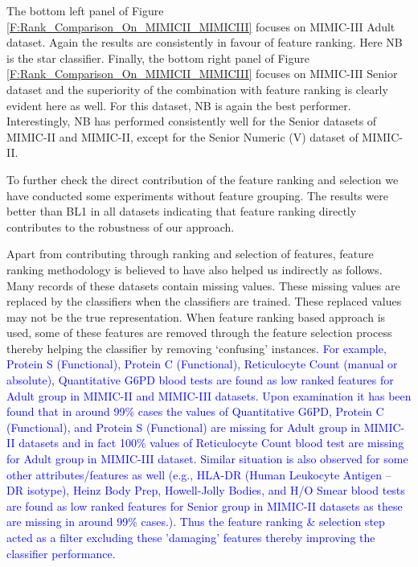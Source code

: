The bottom left panel of Figure \ref{F:Rank_Comparison_On_MIMICII_MIMICIII} focuses on MIMIC-III Adult dataset. Again the results are consistently in favour of feature ranking. Here NB is the star classifier. Finally, the bottom right panel of Figure \ref{F:Rank_Comparison_On_MIMICII_MIMICIII} focuses on MIMIC-III Senior dataset and the superiority of the combination with feature ranking is clearly evident here as well. For this dataset, NB is again the best performer. Interestingly, NB has performed consistently well for the Senior datasets of MIMIC-II and MIMIC-II, except for the Senior Numeric (V) dataset of MIMIC-II. 

To further check the direct contribution of the feature ranking and selection we have conducted some experiments without feature grouping. The results were better than BL1 in all datasets indicating that feature ranking directly contributes to the robustness of our approach.    

Apart from contributing through ranking and selection of features, feature ranking methodology is believed to have also helped us indirectly as follows. Many records of these datasets contain missing values. These missing values are replaced by the classifiers when the classifiers are trained. These replaced values may not be the true representation. When feature ranking based approach is used, some of these features are removed through the feature selection process thereby helping the classifier by removing `confusing' instances. \textcolor{blue}{For example, Protein S (Functional), Protein C (Functional), Reticulocyte Count (manual or absolute), Quantitative G6PD blood tests are found as low ranked features for Adult group in MIMIC-II and MIMIC-III datasets. Upon examination it has been found that in around 99\% cases the values of Quantitative G6PD, Protein C (Functional), and Protein S (Functional) are missing for Adult group in MIMIC-II datasets and in fact 100\% values of Reticulocyte Count blood test are missing for Adult group in MIMIC-III dataset. Similar situation is also observed for some other attributes/features as well (e.g., HLA-DR (Human Leukocyte Antigen – DR isotype), Heinz Body Prep, Howell-Jolly Bodies, and H/O Smear blood tests are found as low ranked features for Senior group in MIMIC-II datasets as these are missing in around 99\% cases.). Thus the feature ranking \& selection step acted as a filter excluding these 'damaging' features thereby improving the classifier performance.}

